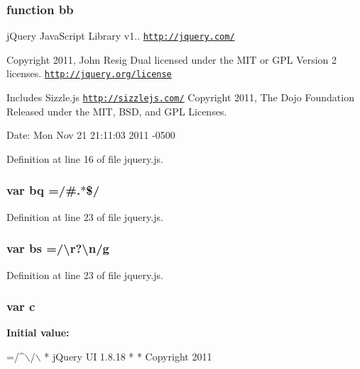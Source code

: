 \subsubsection[{bb}]{\setlength{\rightskip}{0pt plus 5cm}function bb}\label{a00039_a1d6558865876e1c8cca029fce41a4bdb}
j\+Query Java\+Script Library v1.. \href{http://jquery.com/}{\tt http\+://jquery.\+com/}

Copyright 2011, John Resig Dual licensed under the M\+I\+T or G\+P\+L Version 2 licenses. \href{http://jquery.org/license}{\tt http\+://jquery.\+org/license}

Includes Sizzle.\+js \href{http://sizzlejs.com/}{\tt http\+://sizzlejs.\+com/} Copyright 2011, The Dojo Foundation Released under the M\+I\+T, B\+S\+D, and G\+P\+L Licenses.

Date\+: Mon Nov 21 21\+:11\+:03 2011 -\/0500 

Definition at line 16 of file jquery.\+js.

\hypertarget{a00039_af6ee77c71b2c89bdb365145ac5ad1219}{}
\subsubsection[{bq}]{\setlength{\rightskip}{0pt plus 5cm}var bq =/\#.$\ast$\$/}\label{a00039_af6ee77c71b2c89bdb365145ac5ad1219}


Definition at line 23 of file jquery.\+js.

\hypertarget{a00039_ae77642f8ef73fb9c20c2a737d956acda}{}
\subsubsection[{bs}]{\setlength{\rightskip}{0pt plus 5cm}var bs =/\textbackslash{}r?\textbackslash{}n/g}\label{a00039_ae77642f8ef73fb9c20c2a737d956acda}


Definition at line 23 of file jquery.\+js.

\hypertarget{a00039_abce695e0af988ece0826d9ad59b8160d}{}
\subsubsection[{c}]{\setlength{\rightskip}{0pt plus 5cm}var c}\label{a00039_abce695e0af988ece0826d9ad59b8160d}
{\bfseries Initial value\+:}
\begin{DoxyCode}
=/^\(\backslash\)/\(\backslash\)
 * jQuery UI 1.8.18
 *
 * Copyright 2011
\end{DoxyCode}


